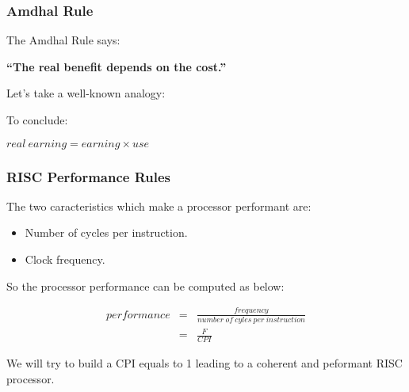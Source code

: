 
\begin{frame}
  \frametitle{Amdhal Rule}

  The Amdhal Rule says:

  \-

  \textbf{``The real benefit depends on the cost.''}

  \-

  Let's take a well-known analogy:

  \begin{center}
  \end{center}

  To conclude:

  \-

  \begin{center}
    $real~earning = earning \times use$
  \end{center}
\end{frame}


\begin{frame}
  \frametitle{RISC Performance Rules}

  The two caracteristics which make a processor performant are:

  \begin{itemize}
    \item
      Number of cycles per instruction.
    \item
      Clock frequency.
  \end{itemize}

  So the processor performance can be computed as below:

  \-

  \begin{eqnarray*}
    performance & = & \frac{frequency}{number~of~cyles~per~instruction} \\
                & = & \frac{F}{CPI}
  \end{eqnarray*}

  \-

  We will try to build a CPI equals to 1 leading to a coherent and peformant
  RISC processor.
\end{frame}


